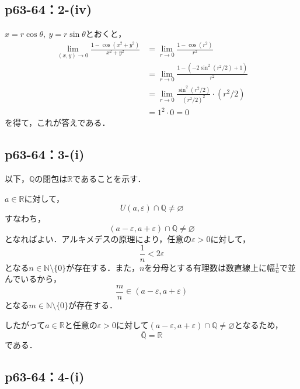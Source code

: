 \documentclass[uplatex,dvipdfmx,a4paper,10pt,fleqn]{jsarticle}
\begin{document}
\subsection*{p63-64：2-(iv)}

\begin{tleftbar}
    $x=r \cos \theta,~y=r\sin \theta$とおくと，
    \begin{align*}
        \lim_{(x,y)\to 0} \frac{1-\cos (x^2+y^2)}{x^2+y^2} & = \lim_{r \to 0} \frac{1-\cos (r^2)}{r^2} \\
        & =\lim_{r \to 0} \frac{1-(-2\sin ^2 (r^2/2)+1)}{r^2} \\
        & =\lim_{r \to 0} \frac{\sin ^2 (r^2/2)}{(r^2/2)^2} \cdot (r^2/2) \\
        & = 1^2 \cdot 0 =0
    \end{align*}
    を得て，これが答えである．
\end{tleftbar}



\subsection*{p63-64：3-(i)}

\begin{tleftbar}
    以下，$\mathbb{Q}$の閉包は$\mathbb{R}$であることを示す．

    $a \in \mathbb{R}$に対して，
    \[
    U(a,\varepsilon) \cap \mathbb{Q} \ne \varnothing
    \]
    すなわち，
    \[
        (a-\varepsilon,a+\varepsilon) \cap \mathbb{Q} \ne \varnothing
    \]
    となればよい．アルキメデスの原理により，任意の$\varepsilon >0$に対して，
    \[
        \frac{1}{n}< 2\varepsilon 
    \]
    となる$n \in \mathbb{N} \setminus \{0\}$が存在する．また，$n$を分母とする有理数は数直線上に幅$\frac{1}{n}$で並んでいるから，
    \[
        \frac{m}{n} \in (a-\varepsilon,a+\varepsilon)
    \]
    となる$ m \in \mathbb{N} \setminus \{0\}$が存在する．\par 
    したがって$a \in \mathbb{R}$と任意の$\varepsilon>0$に対して$(a-\varepsilon,a+\varepsilon) \cap \mathbb{Q} \ne \varnothing$となるため，
    \[
        \overline{\mathbb{Q}}=\mathbb{R}
    \]
    である．
\end{tleftbar}

\subsection*{p63-64：4-(i)}
\end{document}
